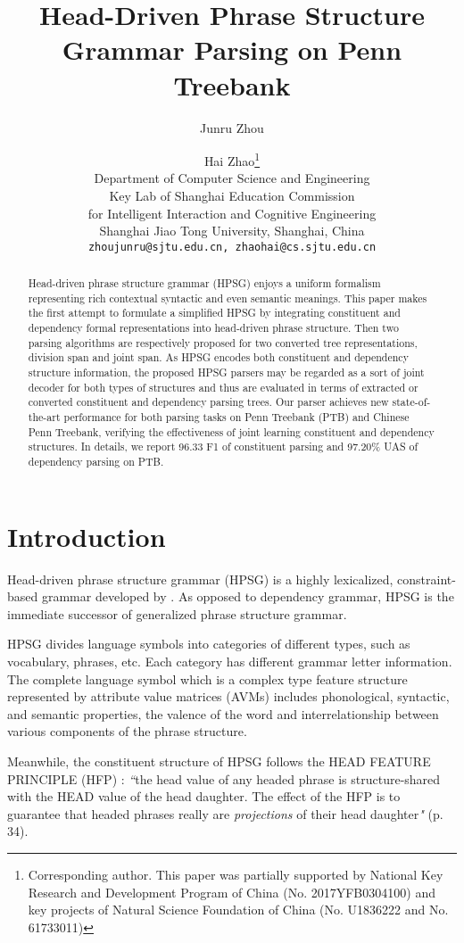 \documentclass[11pt,a4paper]{article}
\title{Head-Driven Phrase Structure Grammar Parsing on Penn Treebank}
\author{Junru Zhou \and Hai Zhao\thanks{  Corresponding author. This paper was partially supported by National
Key Research and Development Program of China (No.
2017YFB0304100) and key projects of Natural Science Foundation of
China (No. U1836222 and No. 61733011)} \\
  Department of Computer Science and Engineering \\
  Key Lab of Shanghai Education Commission \\
  for Intelligent Interaction and Cognitive Engineering \\
  Shanghai Jiao Tong University, Shanghai, China \\
  {\tt zhoujunru@sjtu.edu.cn, zhaohai@cs.sjtu.edu.cn} 
  }
\date{}
\begin{document}
\maketitle
\begin{abstract}

  Head-driven phrase structure grammar
(HPSG) enjoys a uniform formalism representing rich contextual syntactic and even semantic meanings.
This paper makes the first attempt to formulate a simplified HPSG by integrating constituent and
dependency formal representations into head-driven phrase structure.
Then two parsing algorithms are respectively proposed for two converted tree representations, division span and joint span. 
As HPSG encodes both constituent and dependency structure information, the proposed HPSG parsers may be regarded as a sort of joint decoder for both types of structures and thus are evaluated in terms of extracted or converted constituent and dependency parsing trees.
Our parser achieves new state-of-the-art performance for both parsing tasks on Penn Treebank  (PTB) and Chinese Penn Treebank, verifying the effectiveness of joint learning constituent and dependency structures. In details,  we report 96.33 F1 of constituent parsing and 97.20\%  UAS of dependency parsing on PTB.
\end{abstract}

\section{Introduction}

Head-driven phrase structure grammar (HPSG) is a highly lexicalized, constraint-based grammar developed by \cite{pollard1994head}. As opposed to dependency grammar, HPSG is the immediate successor of generalized phrase structure grammar.

HPSG divides language symbols into categories of different types, such as vocabulary, phrases, etc. Each category has different grammar letter information. The complete language symbol which is a complex type feature structure represented by attribute value matrices (AVMs) includes phonological, syntactic, and semantic properties, the valence of the word and interrelationship between various components of the phrase structure.

Meanwhile, the constituent structure of HPSG follows the HEAD FEATURE PRINCIPLE (HFP) \cite{pollard1994head}: \textit{``}the head value of any headed phrase is structure-shared with the HEAD value of the head daughter. The effect of the HFP is to guarantee that headed phrases really are \textit{projections} of their head daughter\textit{"} (p. 34).
\end{document}
